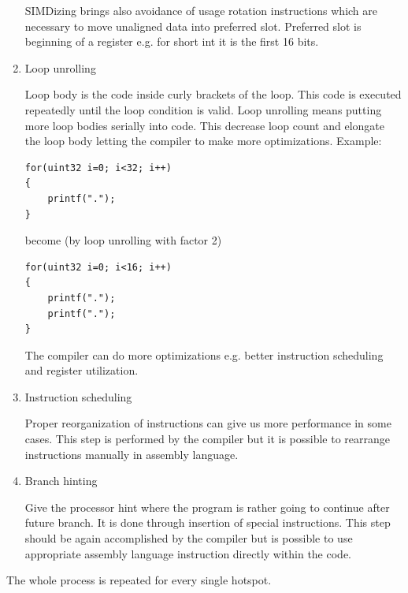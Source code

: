 \begin{enumerate}
\par
SIMDizing brings also avoidance of usage rotation instructions which are necessary to move unaligned data into preferred slot.
Preferred slot is beginning of a register e.g. for short int it is the first 16 bits.

\item{Loop unrolling}
\par
Loop body is the code inside curly brackets of the loop.
This code is executed repeatedly until the loop condition is valid.
Loop unrolling means putting more loop bodies serially into code.
This decrease loop count and elongate the loop body letting the compiler to make more optimizations.
Example:
\begin{verbatim}
for(uint32 i=0; i<32; i++)
{
    printf(".");
}
\end{verbatim}
become (by loop unrolling with factor 2)
\begin{verbatim}
for(uint32 i=0; i<16; i++)
{
    printf(".");
    printf(".");
}
\end{verbatim}
The compiler can do more optimizations e.g. better instruction scheduling and register utilization.

\item{Instruction scheduling}
\par
Proper reorganization of instructions can give us more performance in some cases.
This step is performed by the compiler but it is possible to rearrange instructions manually in assembly language.

\item{Branch hinting}
\par
Give the processor hint where the program is rather going to continue after future branch.
It is done through insertion of special instructions.
This step should be again accomplished by the compiler but is possible to use appropriate assembly language instruction directly within the code.
\end{enumerate}

\par
The whole process is repeated for every single hotspot.

